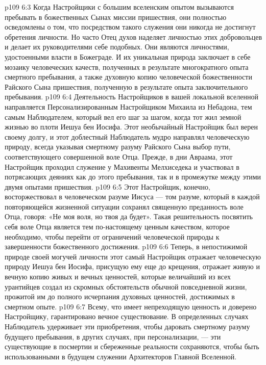 \vs p109 6:3 Когда Настройщики с большим вселенским опытом вызываются пребывать в божественных Сынах миссии пришествия, они полностью осведомлены о том, что посредством такого служения они никогда не достигнут обретения личности. Но часто Отец духов наделяет личностью этих добровольцев и делает их руководителями себе подобных. Они являются личностями, удостоенными власти в Божеграде. И их уникальная природа заключает в себе мозаику человеческих качеств, полученных в результате многократного опыта смертного пребывания, а также духовную копию человеческой божественности Райского Сына пришествия, полученную в результате опыта заключительного пребывания.
\vs p109 6:4 Деятельность Настройщиков в вашей локальной вселенной направляется Персонализированным Настройщиком Михаила из Небадона, тем самым Наблюдателем, который вел его шаг за шагом, когда тот жил земной жизнью во плоти Иешуа бен Иосифа. Этот необычайный Настройщик был верен своему долгу, и этот доблестный Наблюдатель мудро направлял человеческую природу, всегда указывая смертному разуму Райского Сына выбор пути, соответствующего совершенной воле Отца. Прежде, в дни Авраама, этот Настройщик проходил служение у Махивенты Мелхиседека и участвовал в потрясающих деяниях как до этого пребывания, так и в промежутке между этими двумя опытами пришествия.
\vs p109 6:5 Этот Настройщик, конечно, восторжествовал в человеческом разуме Иисуса --- том разуме, который в каждой повторяющейся жизненной ситуации сохранял священную преданность воле Отца, говоря: «Не моя воля, но твоя да будет». Такая решительность посвятить себя воле Отца является тем по\hyp{}настоящему ценным качеством, которое необходимо, чтобы перейти от ограничений человеческой природы к завершенности божественного достижения.
\vs p109 6:6 Теперь, в непостижимой природе своей могучей личности этот самый Настройщик отражает человеческую природу Иешуа бен Иосифа, присущую ему еще до крещения, отражает живую и вечную копию живых и вечных ценностей, которые величайший из всех урантийцев создал из скромных обстоятельств обычной повседневной жизни, прожитой им до полного исчерпания духовных ценностей, достижимых в смертном опыте.
\vs p109 6:7 Всему, что имеет непреходящую ценность и доверено Настройщику, гарантировано вечное существование. В определенных случаях Наблюдатель удерживает эти приобретения, чтобы даровать смертному разуму будущего пребывания, в других случаях, при персонализации, --- эти существующие в посмертии и сбереженные реальности сохраняются, чтобы быть использованными в будущем служении Архитекторов Главной Вселенной.
